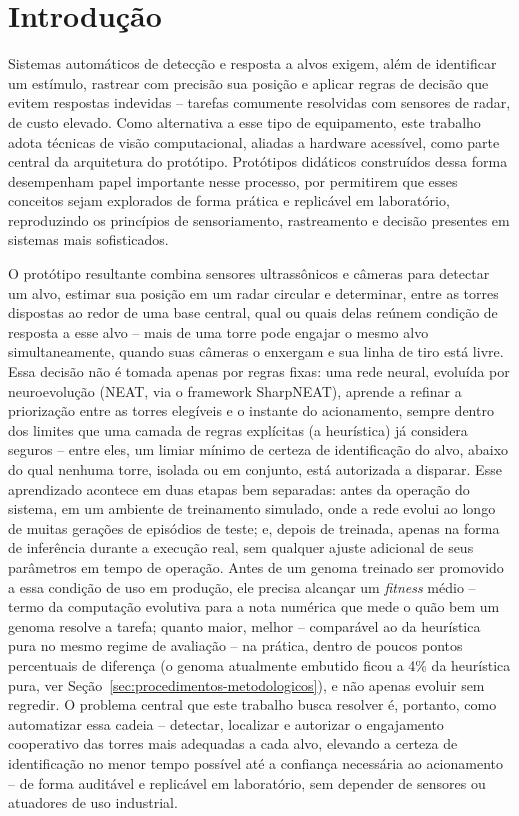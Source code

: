 \documentclass[12pt,a4paper]{article}
\begin{document}
\section{Introdução}

Sistemas automáticos de detecção e resposta a alvos exigem, além de identificar um estímulo,
rastrear com precisão sua posição e aplicar regras de decisão que evitem respostas indevidas --
tarefas comumente resolvidas com sensores de radar, de custo elevado. Como alternativa a esse tipo
de equipamento, este trabalho adota técnicas de visão computacional, aliadas a hardware acessível,
como parte central da arquitetura do protótipo. Protótipos didáticos construídos dessa forma
desempenham papel importante nesse processo, por permitirem que esses conceitos sejam explorados
de forma prática e replicável em laboratório, reproduzindo os princípios de sensoriamento,
rastreamento e decisão presentes em sistemas mais sofisticados.

O protótipo resultante combina sensores ultrassônicos e câmeras para
detectar um alvo, estimar sua posição em um radar circular e determinar, entre as torres dispostas
ao redor de uma base central, qual ou quais delas reúnem condição de resposta a esse alvo -- mais
de uma torre pode engajar o mesmo alvo simultaneamente, quando suas câmeras o enxergam e sua linha
de tiro está livre. Essa decisão não é tomada apenas por regras fixas: uma rede neural, evoluída
por neuroevolução (NEAT, via o framework SharpNEAT), aprende a refinar a priorização entre as
torres elegíveis e o instante do acionamento, sempre dentro dos limites que uma camada de regras explícitas (a
heurística) já considera seguros -- entre eles, um limiar mínimo de certeza de identificação do
alvo, abaixo do qual nenhuma torre, isolada ou em conjunto, está autorizada a disparar. Esse aprendizado
acontece em duas etapas bem separadas: antes da operação do sistema, em um ambiente de treinamento
simulado, onde a rede evolui ao longo de muitas gerações de episódios de teste; e, depois de
treinada, apenas na forma de inferência durante a execução real, sem qualquer ajuste adicional de
seus parâmetros em tempo de operação. Antes de um genoma treinado ser promovido a essa condição de
uso em produção, ele precisa alcançar um \textit{fitness} médio -- termo da computação evolutiva
para a nota numérica que mede o quão bem um genoma resolve a tarefa; quanto maior, melhor -- comparável ao da heurística pura no mesmo
regime de avaliação -- na prática, dentro de poucos pontos percentuais de diferença (o genoma
atualmente embutido ficou a 4\% da heurística pura, ver Seção~\ref{sec:procedimentos-metodologicos}),
e não apenas evoluir sem regredir. O problema central que este trabalho busca resolver é,
portanto, como automatizar essa cadeia -- detectar, localizar e autorizar o engajamento
cooperativo das torres mais adequadas a cada alvo, elevando a certeza de identificação no menor
tempo possível até a confiança necessária ao acionamento -- de forma auditável e replicável em
laboratório, sem depender de sensores ou atuadores
de uso industrial.
\end{document}
